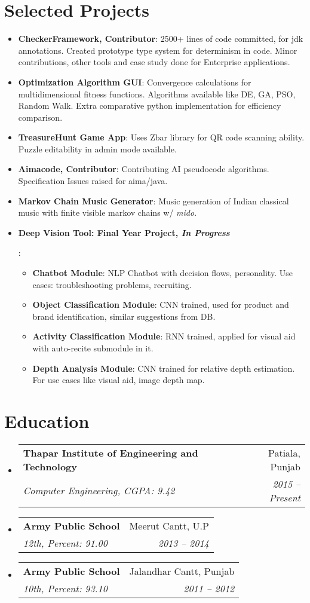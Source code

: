\documentclass[letterpaper,10pt]{article}
\makeatletter
\newcommand{\resumeItem}[2]{
  \item\small{
    \textbf{#1}{: #2 \vspace{-2pt}}
  }
}
\newcommand{\resumeSubheading}[4]{
  \vspace{-1pt}\item
    \begin{tabular*}{0.97\textwidth}{l@{\extracolsep{\fill}}r}
      \textbf{#1} & #2 \\
      \textit{\small#3} & \textit{\small #4} \\
    \end{tabular*}\vspace{-5pt}
}
\newcommand{\resumeSubItem}[2]{\resumeItem{#1}{#2}\vspace{-4pt}}
\newcommand{\resumeSubHeadingListStart}{\begin{itemize}[leftmargin=*]}
\newcommand{\resumeSubHeadingListEnd}{\end{itemize}}
\newcommand{\resumeItemListStart}{\begin{itemize}}
\newcommand{\resumeItemListEnd}{\end{itemize}\vspace{-5pt}}
\makeatother
\begin{document}
\section{Selected Projects}
  \resumeSubHeadingListStart
    \resumeSubItem{CheckerFramework, Contributor}
      {2500+ lines of code committed, for jdk annotations. Created prototype type system for determinism in code. Minor contributions, other tools and case study done for Enterprise applications.}
    \resumeSubItem{Optimization Algorithm GUI}
      {Convergence calculations for multidimensional fitness functions. Algorithms available like DE, GA, PSO, Random Walk. Extra comparative	python implementation for efficiency comparison.}
    \resumeSubItem{TreasureHunt Game App}
      {Uses Zbar library for QR code scanning ability. Puzzle editability in admin mode available.}
    \resumeSubItem{Aimacode, Contributor}
      {Contributing AI pseudocode algorithms. Specification Issues raised for aima/java.}
    \resumeSubItem{Markov Chain Music Generator}
      {Music generation of Indian classical music with finite visible markov chains w/ \textit{mido}.}
    \resumeSubItem{Deep Vision Tool: Final Year Project, \textit{In Progress}}
      {
	    \resumeItemListStart
        \resumeItem{Chatbot Module}
          {NLP Chatbot with decision flows, personality. Use cases: troubleshooting problems, recruiting.}
        \resumeItem{Object Classification Module}
          {CNN trained, used for product and brand identification, similar suggestions from DB.}
        \resumeItem{Activity Classification Module}
          {RNN trained, applied for visual aid with auto-recite submodule in it.}
        \resumeItem{Depth Analysis Module}
          {CNN trained for relative depth estimation. For use cases like visual aid, image depth map.}
       \resumeItemListEnd
      }
  \resumeSubHeadingListEnd

\section{Education}
  \resumeSubHeadingListStart
    \resumeSubheading
      {Thapar Institute of Engineering and Technology}{Patiala, Punjab}
      {Computer Engineering, CGPA: 9.42}{2015 -- Present}
    \resumeSubheading
      {Army Public School}{Meerut Cantt, U.P}
      {12th,  Percent: 91.00}{2013 -- 2014}
    \resumeSubheading
      {Army Public School}{Jalandhar Cantt, Punjab}
      {10th,  Percent: 93.10}{2011 -- 2012}      
  \resumeSubHeadingListEnd
\end{document}
